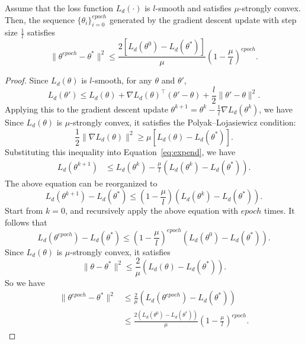 \begin{lemma}
\label{lemma:theta_convergence}
Assume that the loss function \( L_d(\cdot) \) is \( l \)-smooth and satisfies \( \mu \)-strongly convex. Then, the sequence \( \{\theta_{i}\}_{i=0}^{epoch} \) generated by the gradient descent update with step size \( \frac{1}{l} \) satisfies
\[
\|\theta^{epoch} - \theta^*\|^2 \leq \frac{2 [L_d(\theta^0) - L_d(\theta^*)]}{\mu} \left(1 - \frac{\mu}{l}\right)^{epoch}.
\]
\end{lemma}

\begin{proof}
Since \( L_d(\theta) \) is \( l \)-smooth, for any \( \theta \) and \( \theta' \),
\begin{equation*}
    L_d(\theta') \leq L_d(\theta) + \nabla L_d(\theta)^\top (\theta' - \theta) + \frac{l}{2} \|\theta' - \theta\|^2.
\end{equation*}
Applying this to the gradient descent update $\theta^{k+1} = \theta^k - \frac{1}{l} \nabla L_d(\theta^k)$, we have\\
Since  $L_d(\theta)$ is $\mu$-strongly convex, it satisfies the Polyak--Lojasiewicz condition:
\begin{equation*}
\frac{1}{2} \|\nabla L_d(\theta)\|^2 \geq \mu [L_d(\theta) - L_d(\theta^*)].
\end{equation*}
Substituting this inequality into Equation~\ref{eq:expend}, we have
\begin{align*}
L_d(\theta^{k+1}) & \leq L_d(\theta^k) -  \frac{\mu}{l}  (L_d(\theta^k) - L_d(\theta^*)).
\end{align*}
The above equation can be reorganized to
\[
L_d(\theta^{k+1}) - L_d(\theta^*) \leq \left( 1 - \frac{\mu}{l} \right) (L_d(\theta^k) - L_d(\theta^*)).
\]
Start from $k=0$, and recursively apply the above equation with $epoch$ times. It follows that
\[
L_d(\theta^{epoch}) - L_d(\theta^*) \leq \left( 1 - \frac{\mu}{l} \right)^{epoch} (L_d(\theta^0) - L_d(\theta^*)).
\]
Since \( L_d(\theta) \) is \( \mu \)-strongly convex, it satisfies
\[
\|\theta - \theta^*\|^2 \leq \frac{2}{\mu} (L_d(\theta) - L_d(\theta^*)).
\]
So we have
\begin{align*}
\|\theta^{epoch} - \theta^*\|^2 &\leq \frac{2}{\mu} (L_d(\theta^{epoch}) - L_d(\theta^*)) \\
&\leq \frac{2(L_d(\theta^0) - L_d(\theta^*))}{\mu}  \left( 1 - \frac{\mu}{l} \right)^{epoch}.
\end{align*}
\end{proof}


